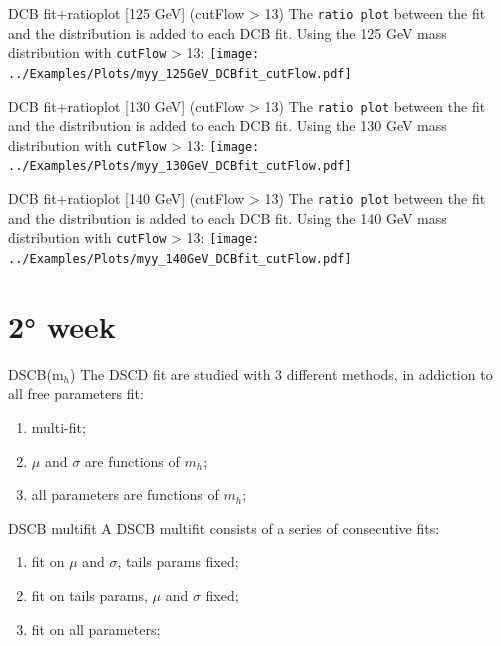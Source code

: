 \documentclass[10pt,UKenglish, leqno, xcolor = dvipsnames]{beamer}
\begin{document}
		\begin{frame}{DCB fit+ratioplot [125 GeV] (cutFlow > 13)}
			\vfill
			The \texttt{ratio plot} between the fit and the distribution is added to each DCB fit. Using the 125 GeV mass distribution with \texttt{cutFlow} > 13:
			\texttt{[image: ../Examples/Plots/myy\_125GeV\_DCBfit\_cutFlow.pdf]}
			\vfill
		\end{frame}
		
		\begin{frame}{DCB fit+ratioplot [130 GeV] (cutFlow > 13)}
			\vfill
			The \texttt{ratio plot} between the fit and the distribution is added to each DCB fit. Using the 130 GeV mass distribution with \texttt{cutFlow} > 13:
			\texttt{[image: ../Examples/Plots/myy\_130GeV\_DCBfit\_cutFlow.pdf]}
			\vfill
		\end{frame}
		
		\begin{frame}{DCB fit+ratioplot [140 GeV] (cutFlow > 13)}
			\vfill
			The \texttt{ratio plot} between the fit and the distribution is added to each DCB fit. Using the 140 GeV mass distribution with \texttt{cutFlow} > 13:
			\texttt{[image: ../Examples/Plots/myy\_140GeV\_DCBfit\_cutFlow.pdf]}
			\vfill
		\end{frame}
	
	\section{2° week}
	\SectionPage
	
		\begin{frame}{DSCB(m$_{h}$)}
			\vfill
			The DSCD fit are studied with 3 different methods, in addiction to all free parameters fit:
			\begin{enumerate}
				\item multi-fit;
				\item $\mu$ and $\sigma$ are functions of $m_h$;
				\item all parameters are functions of $m_h$;
			\end{enumerate}
			\vfill
		\end{frame}

		\begin{frame}{DSCB multifit}
			\vfill
			A DSCB multifit consists of a series of consecutive fits:
			\begin{enumerate}
				\item fit on $\mu$ and $\sigma$, tails params fixed;
				\item fit on tails params, $\mu$ and $\sigma$ fixed;
				\item fit on all parameters;
			\end{enumerate}
			\vfill
		\end{frame}
	
\end{document}
